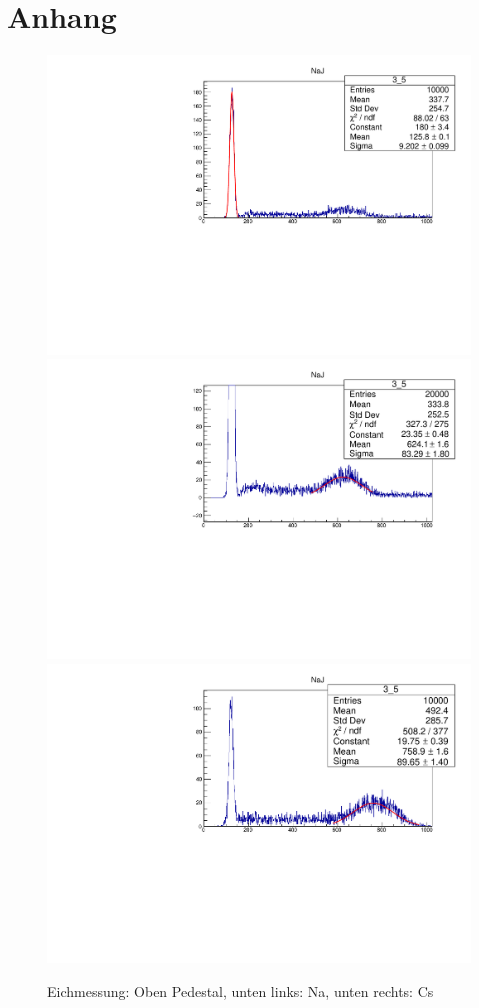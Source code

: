 \documentclass[12pt,a4paper,ngerman]{report}
\begin{document}
	\chapter*{Anhang} \label{ch:Anhang}
    \FloatBarrier



	
		\begin{figure}[ht]
			\centering
			\includegraphics[page=1,width=.4\textwidth]{eich_pedestal2}
			\includegraphics[page=1,width=.4\textwidth]{eich_na2}\hspace*{.25\textwidth}%
			\includegraphics[page=1,width=.4\textwidth]{eich_cs}
			
			\caption{Eichmessung: Oben Pedestal, unten links: Na, unten rechts: Cs}
			\label{fig:Eichmessung}
		\end{figure}
\end{document}
